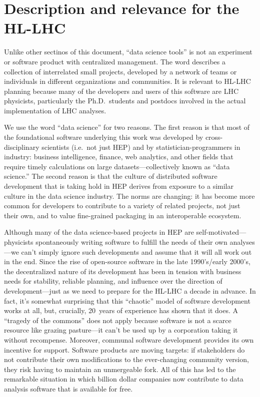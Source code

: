 \documentclass{article}
\begin{document}
\section{Description and relevance for the HL-LHC}

Unlike other sectinos of this document, ``data science tools'' is not an experiment or software product with centralized management. The word describes a collection of interrelated small projects, developed by a network of teams or individuals in different organizations and communities. It is relevant to HL-LHC planning because many of the developers and users of this software are LHC physicists, particularly the Ph.D.\ students and postdocs involved in the actual implementation of LHC analyses.

We use the word ``data science'' for two reasons. The first reason is that most of the foundational software underlying this work was developed by cross-disciplinary scientists (i.e.\ not just HEP) and by statistician-programmers in industry: business intelligence, finance, web analytics, and other fields that require timely calculations on large datasets---collectively known as ``data science.'' The second reason is that the culture of distributed software development that is taking hold in HEP derives from exposure to a similar culture in the data science industry. The norms are changing: it has become more common for developers to contribute to a variety of related projects, not just their own, and to value fine-grained packaging in an interoperable ecosystem.

Although many of the data science-based projects in HEP are self-motivated---physicists spontaneously writing software to fulfill the needs of their own analyses---we can't simply ignore such developments and assume that it will all work out in the end. Since the rise of open-source software in the late 1990's/early 2000's, the decentralized nature of its development has been in tension with business needs for stability, reliable planning, and influence over the direction of development---just as we need to prepare for the HL-LHC a decade in advance. In fact, it's somewhat surprising that this ``chaotic'' model of software development works at all, but, crucially, 20~years of experience has shown that it does. A ``tragedy of the commons'' does not apply because software is not a scarce resource like grazing pasture---it can't be used up by a corporation taking it without recompense. Moreover, communal software development provides its own incentive for support. Software products are moving targets: if stakeholders do not contribute their own modifications to the ever-changing community version, they risk having to maintain an unmergeable fork. All of this has led to the remarkable situation in which billion dollar companies now contribute to data analysis software that is available for free.
\end{document}
